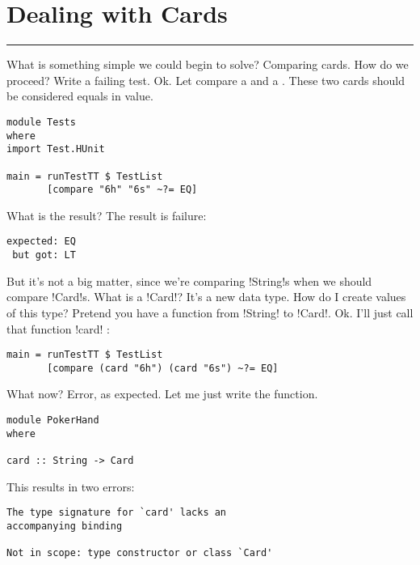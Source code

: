 \newpage
\section{Dealing with Cards} %
\vspace{10cm}
\hrule

\lhQ What is something simple we could begin to solve?
\lhA Comparing cards.
\lhN How do we proceed?
\lhA Write a failing test.
\lhN Ok. Let compare a  and a . These two cards should be considered equals in value.
\begin{lstlisting}[frame=single]
module Tests
where 
import Test.HUnit

main = runTestTT $ TestList 
       [compare "6h" "6s" ~?= EQ]
\end{lstlisting} %
What is the result?
\lhA \failure The result is failure: 
\begin{small} 
\begin{verbatim}
expected: EQ
 but got: LT
\end{verbatim}
\end{small}
But it's not a big matter, since we're comparing \il!String!s when we should compare \il!Card!s.
\lhN What is a \il!Card!?
\lhA It's a new data type.
\lhN How do I create values of this type?
\lhA Pretend you have a function from \il!String! to \il!Card!.
\lhN Ok. I'll just call that function \il!card! :
\begin{lstlisting}[frame=single]
main = runTestTT $ TestList 
       [compare (card "6h") (card "6s") ~?= EQ] 
\end{lstlisting} %
What now?
\lhA \error Error, as expected. Let me just write the function.
\begin{lstlisting}[frame=single]
module PokerHand
where

card :: String -> Card
\end{lstlisting}
\lhN \error This results in two errors: 
\begin{small}
\begin{verbatim}
The type signature for `card' lacks an 
accompanying binding

Not in scope: type constructor or class `Card'
\end{verbatim}
\end{small}
